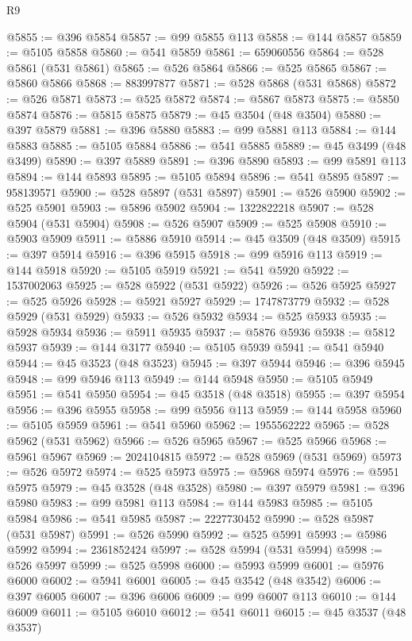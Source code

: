 \begin{lexlean}{R9}
\begin{coremodule}
@5855 := @396 @5854
@5857 := @99 @5855 @113
@5858 := @144 @5857
@5859 := @5105 @5858
@5860 := @541 @5859
@5861 := 659060556
@5864 := @528 @5861 (@531 @5861)
@5865 := @526 @5864
@5866 := @525 @5865
@5867 := @5860 @5866
@5868 := 883997877
@5871 := @528 @5868 (@531 @5868)
@5872 := @526 @5871
@5873 := @525 @5872
@5874 := @5867 @5873
@5875 := @5850 @5874
@5876 := @5815 @5875
@5879 := @45 @3504 (@48 @3504)
@5880 := @397 @5879
@5881 := @396 @5880
@5883 := @99 @5881 @113
@5884 := @144 @5883
@5885 := @5105 @5884
@5886 := @541 @5885
@5889 := @45 @3499 (@48 @3499)
@5890 := @397 @5889
@5891 := @396 @5890
@5893 := @99 @5891 @113
@5894 := @144 @5893
@5895 := @5105 @5894
@5896 := @541 @5895
@5897 := 958139571
@5900 := @528 @5897 (@531 @5897)
@5901 := @526 @5900
@5902 := @525 @5901
@5903 := @5896 @5902
@5904 := 1322822218
@5907 := @528 @5904 (@531 @5904)
@5908 := @526 @5907
@5909 := @525 @5908
@5910 := @5903 @5909
@5911 := @5886 @5910
@5914 := @45 @3509 (@48 @3509)
@5915 := @397 @5914
@5916 := @396 @5915
@5918 := @99 @5916 @113
@5919 := @144 @5918
@5920 := @5105 @5919
@5921 := @541 @5920
@5922 := 1537002063
@5925 := @528 @5922 (@531 @5922)
@5926 := @526 @5925
@5927 := @525 @5926
@5928 := @5921 @5927
@5929 := 1747873779
@5932 := @528 @5929 (@531 @5929)
@5933 := @526 @5932
@5934 := @525 @5933
@5935 := @5928 @5934
@5936 := @5911 @5935
@5937 := @5876 @5936
@5938 := @5812 @5937
@5939 := @144 @3177
@5940 := @5105 @5939
@5941 := @541 @5940
@5944 := @45 @3523 (@48 @3523)
@5945 := @397 @5944
@5946 := @396 @5945
@5948 := @99 @5946 @113
@5949 := @144 @5948
@5950 := @5105 @5949
@5951 := @541 @5950
@5954 := @45 @3518 (@48 @3518)
@5955 := @397 @5954
@5956 := @396 @5955
@5958 := @99 @5956 @113
@5959 := @144 @5958
@5960 := @5105 @5959
@5961 := @541 @5960
@5962 := 1955562222
@5965 := @528 @5962 (@531 @5962)
@5966 := @526 @5965
@5967 := @525 @5966
@5968 := @5961 @5967
@5969 := 2024104815
@5972 := @528 @5969 (@531 @5969)
@5973 := @526 @5972
@5974 := @525 @5973
@5975 := @5968 @5974
@5976 := @5951 @5975
@5979 := @45 @3528 (@48 @3528)
@5980 := @397 @5979
@5981 := @396 @5980
@5983 := @99 @5981 @113
@5984 := @144 @5983
@5985 := @5105 @5984
@5986 := @541 @5985
@5987 := 2227730452
@5990 := @528 @5987 (@531 @5987)
@5991 := @526 @5990
@5992 := @525 @5991
@5993 := @5986 @5992
@5994 := 2361852424
@5997 := @528 @5994 (@531 @5994)
@5998 := @526 @5997
@5999 := @525 @5998
@6000 := @5993 @5999
@6001 := @5976 @6000
@6002 := @5941 @6001
@6005 := @45 @3542 (@48 @3542)
@6006 := @397 @6005
@6007 := @396 @6006
@6009 := @99 @6007 @113
@6010 := @144 @6009
@6011 := @5105 @6010
@6012 := @541 @6011
@6015 := @45 @3537 (@48 @3537)

\end{coremodule}
\end{lexlean}
